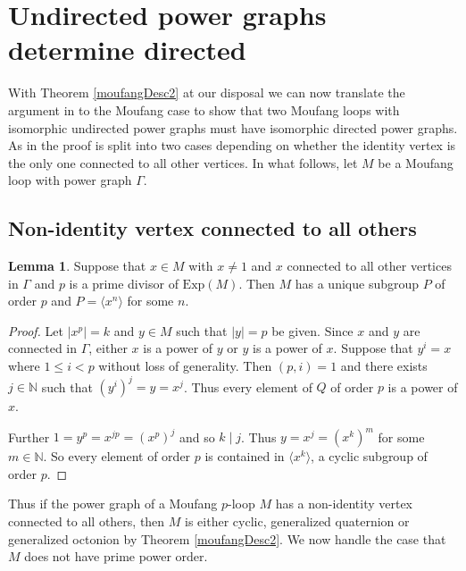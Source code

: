 \documentclass[12pt, twoside, openright]{report}
\theoremstyle{definition}
\newtheorem{lem}[thm]{Lemma}
\newcommand{\Exp}{\text{Exp}}       %
\begin{document}

\section{Undirected power graphs determine directed} \label{gen-oct}

With Theorem \ref{moufangDesc2} at our disposal we can now translate the argument in \cite{PGII} to the
  Moufang case to show that two Moufang loops with isomorphic undirected power graphs must have isomorphic
  directed power graphs. As in \cite{PGII} the proof is split into two cases depending on whether the
  identity vertex is the only one connected to all other vertices. In what follows, let $M$ be a Moufang
  loop with power graph $\Gamma$.

\subsection{Non-identity vertex connected to all others}\label{multi-vert}

\begin{lem}\label{connectedVertex}
  Suppose that $x\in M$ with $x\neq 1$ and $x$ connected to all other vertices in $\Gamma$ and $p$ is a
    prime divisor of $\Exp(M)$. Then $M$ has a unique subgroup $P$ of order $p$ and
    $P = \langle x^n \rangle$ for some $n$.
\end{lem}

\begin{proof}
  Let $|x^p| = k$ and $y\in M$ such that $|y| = p$ be given. Since $x$ and $y$ are connected in
    $\Gamma$, either $x$ is a power of $y$ or $y$ is a power of $x$. Suppose that $y^i = x$
    where $1\leq i < p$ without loss of generality. Then $(p, i) = 1$ and there exists
    $j\in\mathbb{N}$ such that $(y^i)^j = y = x^j$. Thus every element of $Q$ of order $p$
    is a power of $x$.

  Further $1 = y^p = x^{jp} = (x^p)^j$ and so $k\mid j$. Thus $y = x^j = (x^k)^m$ for some
    $m\in \mathbb{N}$. So every element of order $p$ is contained in $\langle x^k\rangle$,
    a cyclic subgroup of order $p$.
\end{proof}

Thus if the power graph of a Moufang $p$-loop $M$ has a non-identity vertex connected to all
  others, then $M$ is either cyclic, generalized quaternion or generalized octonion by Theorem
  \ref{moufangDesc2}. We now handle the case that $M$ does not have prime power order.
\end{document}

